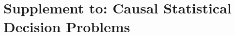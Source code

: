 \documentclass{article}
\theoremstyle{plain}
\theoremstyle{definition}
\newcommand{\papertitle}{Causal Statistical Decision Problems}
\begin{document}





\appendix
\newpage
\section*{Supplement to: \papertitle}

% 
% 
% 
% 
\end{document}
